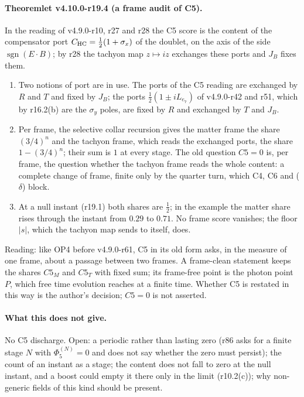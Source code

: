 \paragraph{Theoremlet v4.10.0-r19.4 (a frame audit of C5).}
In the reading of v4.9.0-r10, r27 and r28 the C5 score is the content of the compensator port \(C_{\rm HC}=\tfrac12(1+\sigma_x)\) of the
doublet, on the axis of the side \(\operatorname{sgn}(E\cdot B)\); by r28 the tachyon map \(z\mapsto iz\) exchanges these ports and \(J_B\) fixes them.
\begin{enumerate}[leftmargin=2em]
\item[(a)] Two notions of port are in use.  The ports of the C5 reading are exchanged by \(R\) and \(T\) and fixed by \(J_B\); the ports
\(\tfrac12(1\pm iL_{e_7})\) of v4.9.0-r42 and r51, which by r16.2(b) are the \(\sigma_y\) poles, are fixed by \(R\) and exchanged by \(T\) and \(J_B\).
\item[(b)] Per frame, the selective collar recursion gives the matter frame the share \((3/4)^n\) and the tachyon frame, which reads the
exchanged ports, the share \(1-(3/4)^n\); their sum is \(1\) at every stage.  The old question \(C5=0\) is, per frame, the question whether the
tachyon frame reads the whole content: a complete change of frame, finite only by the quarter turn, which C4, C6 and (\(\delta\)) block.
\item[(c)] At a null instant (r19.1) both shares are \(\tfrac12\); in the example the matter share rises through the instant from \(0.29\) to
\(0.71\).  No frame score vanishes; the floor \(|s|\), which the tachyon map sends to itself, does.
\end{enumerate}
Reading: like OP4 before v4.9.0-r61, C5 in its old form asks, in the measure of one frame, about a passage between two frames.  A
frame-clean statement keeps the shares \(C5_M\) and \(C5_T\) with fixed sum; its frame-free point is the photon point \(P\), which free time
evolution reaches at a finite time.  Whether C5 is restated in this way is the author's decision; \(C5=0\) is not asserted.

\paragraph{What this does not give.}
No C5 discharge.  Open: a periodic rather than lasting zero (r86 asks for a finite stage \(N\) with \(\Phi_5^{(N)}=0\) and does not say
whether the zero must persist); the count of an instant as a stage; the content does not fall to zero at the null instant, and a boost
could empty it there only in the limit (r10.2(c)); why non-generic fields of this kind should be present.

